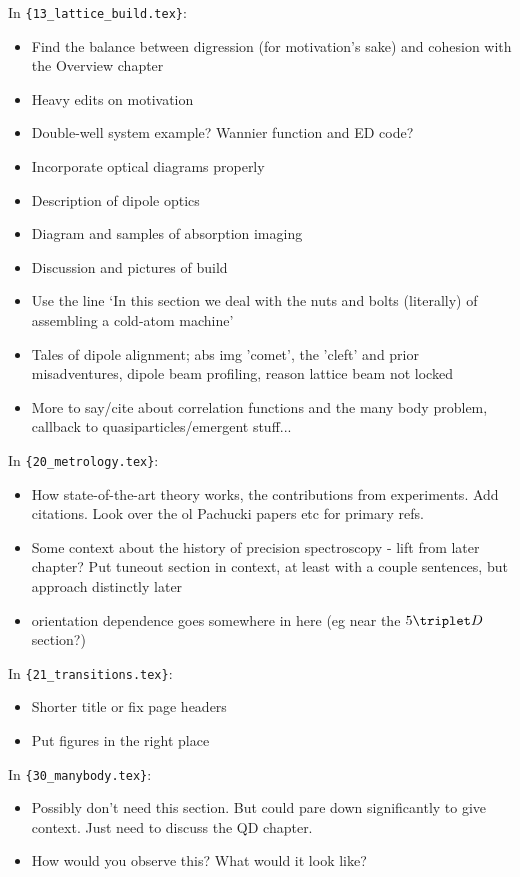 In \verb|{13_lattice_build.tex}|:
\begin{itemize}
\item {Find the balance between digression (for motivation's sake) and cohesion with the Overview chapter}
\item {Heavy edits on motivation}
\item {Double-well system example? Wannier function and ED code?}
\item {Incorporate optical diagrams properly}
\item {Description of dipole optics}
\item {Diagram and samples of absorption imaging}
\item {Discussion and pictures of build}
\item {Use the line `In this section we deal with the nuts and bolts (literally) of assembling a cold-atom machine'}
\item {Tales of dipole alignment; abs img 'comet', the 'cleft' and prior misadventures, dipole beam profiling, reason lattice beam not locked}
\item {More to say/cite about correlation functions and the many body problem, callback to quasiparticles/emergent stuff...}
\end{itemize}
In \verb|{20_metrology.tex}|:
\begin{itemize}
\item {How state-of-the-art theory works, the contributions from experiments. Add citations. Look over the ol Pachucki papers etc for primary refs. }
\item {Some context about the history of precision spectroscopy - lift from later chapter? Put tuneout section in context, at least with a couple sentences, but approach distinctly later}
\item {orientation dependence goes somewhere in here (eg near the $5\triplet D$ section?)}
\end{itemize}
In \verb|{21_transitions.tex}|:
\begin{itemize}
\item {Shorter title or fix page headers}
\item {Put figures in the right place}
\end{itemize}
In \verb|{30_manybody.tex}|:
\begin{itemize}
\item {Possibly don't need this section. But could pare down significantly to give context. Just need to discuss the QD chapter.}
\item {How would you observe this?  What would it look like?}
\end{itemize}

